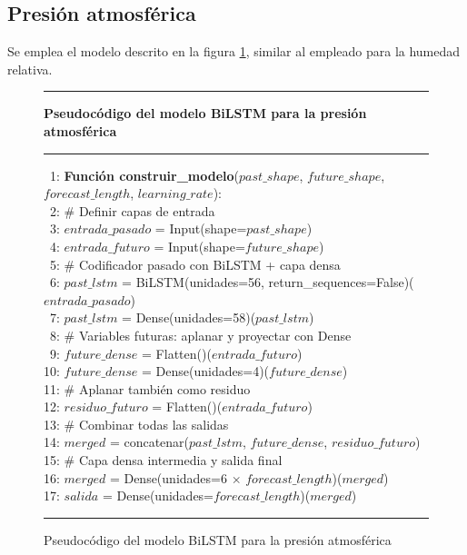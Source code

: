 \subsection{Presión atmosférica}
Se emplea el modelo descrito en la figura \ref{lstm_model_pres}, similar al empleado para la humedad relativa.
\begin{figure}[H]
{\small
\hrule
{\bf\small Pseudocódigo del modelo BiLSTM para la presión atmosférica}
\hrule
\begin{center}
\begin{tabbing}
\ 1: {\bf Fun}\={\bf ción construir\_modelo}($past\_shape$, $future\_shape$, $forecast\_length$, $learning\_rate$): \\
\ 2: \> \# Definir capas de entrada \\
\ 3: \> $entrada\_pasado$ = Input(shape=$past\_shape$) \\
\ 4: \> $entrada\_futuro$ = Input(shape=$future\_shape$) \\
\ 5: \> \# Codificador pasado con BiLSTM + capa densa \\
\ 6: \> $past\_lstm$ = BiLSTM(unidades=56, return\_sequences=False)($entrada\_pasado$) \\
\ 7: \> $past\_lstm$ = Dense(unidades=58)($past\_lstm$) \\
\ 8: \> \# Variables futuras: aplanar y proyectar con Dense \\
\ 9: \> $future\_dense$ = Flatten()($entrada\_futuro$) \\
10: \> $future\_dense$ = Dense(unidades=4)($future\_dense$) \\
11: \> \# Aplanar también como residuo \\
12: \> $residuo\_futuro$ = Flatten()($entrada\_futuro$) \\
13: \> \# Combinar todas las salidas \\
14: \> $merged$ = concatenar($past\_lstm$, $future\_dense$, $residuo\_futuro$) \\
15: \> \# Capa densa intermedia y salida final \\
16: \> $merged$ = Dense(unidades=6 $\times$ $forecast\_length$)($merged$) \\
17: \> $salida$ = Dense(unidades=$forecast\_length$)($merged$) \\
\end{tabbing}
\end{center}
}
\hrule
\caption{Pseudocódigo del modelo BiLSTM para la presión atmosférica}
\label{lstm_model_pres}
\end{figure}


